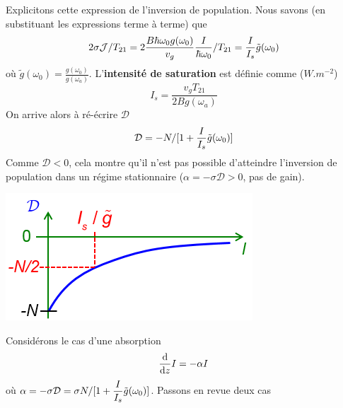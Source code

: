 Explicitons cette expression de l'inversion de population. Nous savons (en substituant les expressions 
terme à terme) que
\begin{equation}
2\sigma {{\cal J}}/{T_{21}} = 2\frac{{B\hbar {\omega _0}g({\omega _0})}}{{{v_g}}}\frac{I}{{\hbar {\omega _0}}}/{T_{21}} = \frac{I}{{{I_s}}}\tilde g({\omega _0})
\end{equation}
où $\tilde g({\omega _0}) = \frac{{g({\omega _0})}}{{g({\omega _a})}}$. L'\textbf{intensité de 
saturation} est définie comme ($W.m^{-2}$)
\begin{equation}
{I_s} = \frac{{{v_g}{T_{21}}}}{{2Bg({\omega _a})}}
\end{equation}
On arrive alors à ré-écrire $\mathcal{D}$
\begin{equation}
{{\cal D}} =  - N/[1 + \frac{I}{{{I_s}}}\tilde g({\omega _0})]
\end{equation}
Comme $\mathcal{D}<0$, cela montre qu'il n'est pas possible d'atteindre l'inversion de population 
dans un régime stationnaire ($\alpha = -\sigma\mathcal{D} > 0$, pas de gain). 
\begin{center}
	\includegraphics[scale=0.6]{ch4/image2.png}
\end{center}
Considérons le cas 
d'une absorption
\begin{equation}
\frac{{\rm{d}}}{{{\rm{d}}z}}I =  - \alpha I
\end{equation}
où $\displaystyle\alpha  =  - \sigma {{\cal D}} = \sigma N/[1 + \frac{I}{{{I_s}}}\tilde g({\omega _0})]$. 
Passons en revue deux cas 
